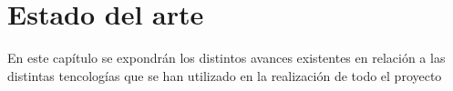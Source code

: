 \chapter{Estado del arte}
En este capítulo se expondrán los distintos avances existentes en relación a
las distintas tencologías que se han utilizado en la realización de todo el proyecto

